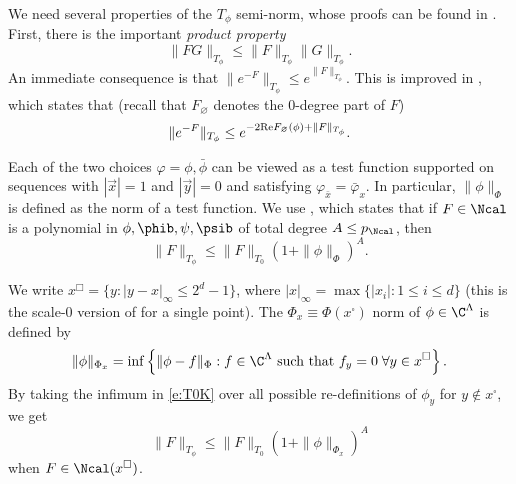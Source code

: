 We need several properties of the $T_\phi$ semi-norm,
whose proofs can be found in \cite{BS-rg-norm}.
First, there is the important \emph{product property}
\cite[Proposition~\ref{norm-prop:prod}]{BS-rg-norm}
\begin{equation}
\label{e:prod}
\|F G\|_{T_\phi} \leq \|F\|_{T_\phi} \|G\|_{T_\phi}.
\end{equation}
An immediate consequence is that $\|e^{-F}\|_{T_\phi} \leq e^{\|F\|_{T_\phi}}$.
This is improved in \cite[Proposition~\ref{norm-prop:eK}]{BS-rg-norm},
which states that (recall that $F_\varnothing$ denotes the $0$-degree part of $F$)
\begin{equation}
\label{e:eK}
\|e^{-F}\|_{T_\phi} \leq e^{-2 {\rm Re} F_\varnothing(\phi) + \|F\|_{T_\phi}}.
\end{equation}

Each of the two choices $\varphi = \phi, \bar\phi$
can be viewed as a test function supported on sequences with
$|\vec x| = 1$ and $|\vec y| = 0$
and satisfying $\varphi_{\bar x} = \bar\varphi_x$.
In particular, $\|\phi\|_\Phi$ is defined as the norm of a test function.
We use \cite[Proposition~\ref{norm-prop:T0K}]{BS-rg-norm},
which states that if $F \in \Ncal$ is a polynomial in $\phi,\phib,\psi,\psib$ of
total degree $A \leq p_\Ncal$, then
\begin{equation}
\label{e:T0K}
\|F\|_{T_\phi} \leq \|F\|_{T_0} (1 + \|\phi\|_\Phi)^A.
\end{equation}

We write $x^\Box = \{y: |y-x|_\infty \le 2^d-1\}$,
where $|x|_\infty = \max\{|x_i| : 1 \le i \le d\}$
(this is the scale-0 version
of \cite[\eqref{IE-e:ssn}]{BS-rg-IE} for a single point).
The $\Phi_x \equiv \Phi(x^\square)$ norm of $\phi \in \C^\Lambda$ is defined by
\begin{equation}
\|\phi\|_{\Phi_x}
  =
\inf
\left\{
  \|\phi - f\|_\Phi : f \in \C^\Lambda \text{ such that } f_y = 0 \;\forall y \in x^\square
\right\}
.
\end{equation}
By taking the infimum in \eqref{e:T0K} over all possible
re-definitions of $\phi_y$ for $y \notin x^\square$, we get
\begin{equation}
\label{e:T0Kx}
\|F\|_{T_\phi}
  \leq
\|F\|_{T_0} (1 + \|\phi\|_{\Phi_x})^A
\end{equation}
when $F \in \Ncal(x^\square)$.

